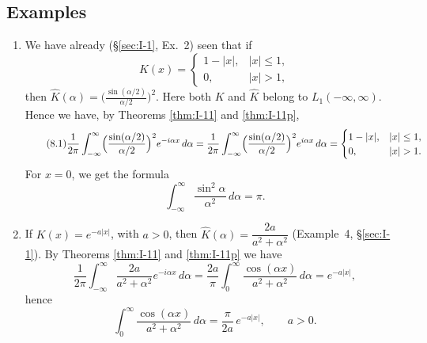 \subsection*{Examples}
\begin{enumerate}[label=\arabic*.,ref=\arabic*]
\item We have already (\S\ref{sec:I-1}, Ex.~2) seen that if
\begin{equation*}
K(x)=
\begin{cases}
1-|x|,&|x|\le 1,\\
0,&|x|>1,
\end{cases}
\end{equation*}
then $\hat K(\alpha)=\bigl(\frac{\sin(\alpha/2)}{\alpha/2}\bigr)^2$. Here both $K$ and $\hat K$ belong to $L_1(-\infty,\infty)$. Hence we have, by Theorems \ref{thm:I-11} and \ref{thm:I-11p},
\begin{equation}\label{eq:I-8.1}\tag{8.1}
\frac{1}{2\pi}\int_{-\infty}^{\infty}\Bigl(\frac{\sin(\alpha/2)}{\alpha/2}\Bigr)^{2}e^{-i\alpha x}\,d\alpha
=\frac{1}{2\pi}\int_{-\infty}^{\infty}\Bigl(\frac{\sin(\alpha/2)}{\alpha/2}\Bigr)^{2}e^{i\alpha x}\,d\alpha
=
\begin{cases}
1-|x|,&|x|\le 1,\\
0,&|x|>1.
\end{cases}
\end{equation}
For $x=0$, we get the formula
\begin{equation}\label{eq:I-8.2}\tag{8.2}
\int_{-\infty}^{\infty}\frac{\sin^{2}\alpha}{\alpha^{2}}\,d\alpha=\pi.
\end{equation}

\item If $K(x)=e^{-a|x|}$, with $a>0$, then $\hat K(\alpha)=\dfrac{2a}{a^{2}+\alpha^{2}}$ (Example~4, \S\ref{sec:I-1}). By Theorems \ref{thm:I-11} and \ref{thm:I-11p} we have
\begin{equation*}
\frac{1}{2\pi}\int_{-\infty}^{\infty}\frac{2a}{a^{2}+\alpha^{2}}e^{-i\alpha x}\,d\alpha
=\frac{2a}{\pi}\int_{0}^{\infty}\frac{\cos(\alpha x)}{a^{2}+\alpha^{2}}\,d\alpha
=e^{-a|x|},
\end{equation*}
hence
\begin{equation}\label{eq:I-8.3}\tag{8.3}
\int_{0}^{\infty}\frac{\cos(\alpha x)}{a^{2}+\alpha^{2}}\,d\alpha=\frac{\pi}{2a}\,e^{-a|x|},\qquad a>0.
\end{equation}


\end{enumerate}
